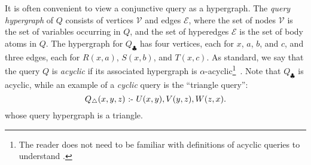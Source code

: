 It is often convenient to view a conjunctive query as
a hypergraph.  The \emph{query hypergraph} of $Q$ consists of vertices
$\mathcal{V}$ and edges $\mathcal{E}$, where the set of nodes
$\mathcal{V}$ is the set of variables occurring in $Q$, and the set of
hyperedges $\mathcal{E}$ is the set of body atoms in $Q$.
The hypergraph for $Q_\clubsuit$ has four vertices, each for
$x$, $a$, $b$, and $c$,
and three edges, each for $R(x, a)$, $S(x, b)$, and $T(x, c)$.
As standard, we
say that the query $Q$ is {\em acyclic} if its associated hypergraph
is $\alpha$-acyclic\footnote{The reader does not need to be familiar
  with definitions of acyclic queries to understand \FJ.}~\cite{DBLP:journals/jacm/Fagin83}.
Note that $Q_\clubsuit$ is acyclic,
while an example of a {\em cyclic} query is the ``triangle query'':
$$Q_\triangle(x, y, z) \text{ :- } U(x, y), V(y, z), W(z, x).$$
whose query hypergraph is a triangle.






